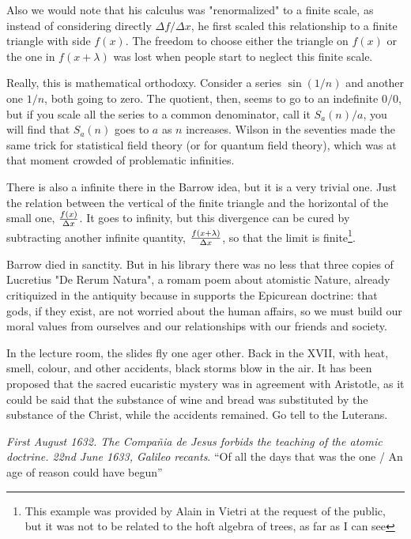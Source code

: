 \documentclass[a4paper,10pt]{article}
\begin{document}
Also we would note that his calculus was "renormalized" to a finite
scale, as instead of considering directly $\Delta f/\Delta x$, he first
scaled this relationship to a finite triangle with side $f(x)$. The
freedom to choose either the triangle on $f(x)$ or the one in $f(x+\lambda)$
was lost when people start to neglect this finite scale.

Really, this is mathematical orthodoxy. Consider a series $\sin (1/n)$ and another
one $1/n$, both going to zero. The quotient, then, seems to go to an indefinite
$0/0$, but if you scale all the series to a common denominator, call it
$S_a(n)/a$, you will find that $S_a(n)$ goes to $a$ as $n$ increases. Wilson
in the seventies made the same trick for statistical field theory (or for
quantum field theory), which was at that moment crowded of problematic
infinities.

There is also a infinite there in the Barrow idea, but it is a very trivial
one. Just the relation between the vertical of the finite triangle and
the horizontal of the small one, $f(x)\over \Delta x$. It goes to infinity, but
this divergence can be cured by subtracting another infinite quantity,
$f(x+\lambda)\over \Delta x$, so that the limit is finite\footnote{This
example was provided by Alain in Vietri at the request of the public, but
it was not to be related to the hoft algebra of trees, as far as I can see}.

Barrow died in sanctity. But in his library \cite{feingold} there was no less
that three copies of Lucretius "De Rerum Natura", a romam poem about
atomistic Nature, already critiquized in the antiquity because in
supports the Epicurean doctrine: that gods, if they exist, are not
worried about the human affairs, so we must build our moral values
from ourselves and our relationships with our friends and society. 

In the lecture room, the slides fly one ager other. Back in the XVII,
with heat, smell, colour, and other accidents, 
black storms blow in the air. It has been proposed that the sacred
eucaristic mystery was in agreement with Aristotle, as it could be said
that the substance of wine and bread was substituted by the substance
of the Christ, while the accidents remained. Go tell to the Luterans.  

{\it First August 1632. The Compa\~nia de Jesus forbids the teaching of the
atomic doctrine. 22nd June 1633, Galileo recants}. ``Of all the days that 
was the one / An age of reason could have begun'' \cite{brecht}
\end{document}
